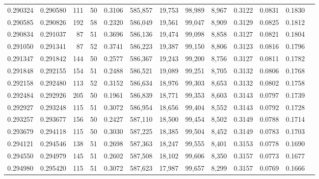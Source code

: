 \begin{tabular}{rrrrrrrrrrrrr}
0.290324 & 0.290580 &   111 &  50 &                                     0.3106 & 585,857 &  19,753 &  98,989 &   8,967 & 0.3122 & 0.0831 & 0.1830 \\
0.290585 & 0.290826 &   192 &  58 &                                     0.2320 & 586,049 &  19,561 &  99,047 &   8,909 & 0.3129 & 0.0825 & 0.1812 \\
0.290834 & 0.291037 &    87 &  51 &                                     0.3696 & 586,136 &  19,474 &  99,098 &   8,858 & 0.3127 & 0.0821 & 0.1804 \\
0.291050 & 0.291341 &    87 &  52 &                                     0.3741 & 586,223 &  19,387 &  99,150 &   8,806 & 0.3123 & 0.0816 & 0.1796 \\
0.291347 & 0.291842 &   144 &  50 &                                     0.2577 & 586,367 &  19,243 &  99,200 &   8,756 & 0.3127 & 0.0811 & 0.1782 \\
0.291848 & 0.292155 &   154 &  51 &                                     0.2488 & 586,521 &  19,089 &  99,251 &   8,705 & 0.3132 & 0.0806 & 0.1768 \\
0.292158 & 0.292480 &   113 &  52 &                                     0.3152 & 586,634 &  18,976 &  99,303 &   8,653 & 0.3132 & 0.0802 & 0.1758 \\
0.292484 & 0.292926 &   205 &  50 &                                     0.1961 & 586,839 &  18,771 &  99,353 &   8,603 & 0.3143 & 0.0797 & 0.1739 \\
0.292927 & 0.293248 &   115 &  51 &                                     0.3072 & 586,954 &  18,656 &  99,404 &   8,552 & 0.3143 & 0.0792 & 0.1728 \\
0.293257 & 0.293677 &   156 &  50 &                                     0.2427 & 587,110 &  18,500 &  99,454 &   8,502 & 0.3149 & 0.0788 & 0.1714 \\
0.293679 & 0.294118 &   115 &  50 &                                     0.3030 & 587,225 &  18,385 &  99,504 &   8,452 & 0.3149 & 0.0783 & 0.1703 \\
0.294121 & 0.294546 &   138 &  51 &                                     0.2698 & 587,363 &  18,247 &  99,555 &   8,401 & 0.3153 & 0.0778 & 0.1690 \\
0.294550 & 0.294979 &   145 &  51 &                                     0.2602 & 587,508 &  18,102 &  99,606 &   8,350 & 0.3157 & 0.0773 & 0.1677 \\
0.294980 & 0.295420 &   115 &  51 &                                     0.3072 & 587,623 &  17,987 &  99,657 &   8,299 & 0.3157 & 0.0769 & 0.1666 \\

\end{tabular}
